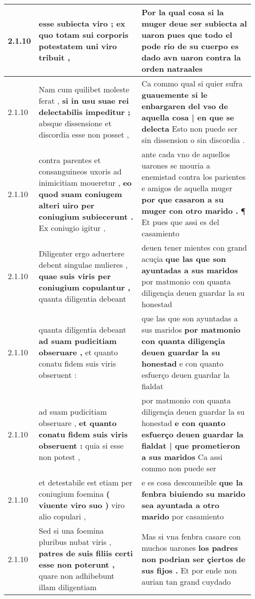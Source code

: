 \begin{tabular}{|p{1cm}|p{6.5cm}|p{6.5cm}|}
2.1.10 & esse subiecta viro ; \textbf{ ex quo totam sui corporis potestatem } uni viro tribuit , & Por la qual cosa si la muger deue ser subiecta al uaron \textbf{ pues que todo el pode rio de su cuerpo es dado avn uaron } contra la orden natraales \\\hline
2.1.10 & Nam cum quilibet moleste ferat , \textbf{ si in usu suae rei delectabilis impeditur ; } absque dissensione et discordia esse non posset , & Ca commo qual si quier sufra \textbf{ guauemente si le enbargaren del vso de aquella cosa | en que se delecta } Esto non puede ser sin dissension o sin discordia . \\\hline
2.1.10 & contra parentes et consanguineos uxoris ad inimicitiam moueretur , \textbf{ eo quod suam coniugem alteri uiro per coniugium subiecerunt . } Ex coniugio igitur , & ante cada vno de aquellos uarones se mouria a enemistad contra los parientes e amigos de aquella muger \textbf{ por que casaron a su muger con otro marido . } ¶ Et pues que assi es del casamiento \\\hline
2.1.10 & Diligenter ergo aduertere debent singulae mulieres , \textbf{ quae suis viris per coniugium copulantur , } quanta diligentia debeant & deuen tener mientes con grand acuçia \textbf{ que las que son ayuntadas a sus maridos } por matmonio con quanta diligençia deuen guardar la su honestad \\\hline
2.1.10 & quanta diligentia debeant \textbf{ ad suam pudicitiam obseruare , } et quanto conatu fidem suis viris obseruent : & que las que son ayuntadas a sus maridos \textbf{ por matmonio con quanta diligençia deuen guardar la su honestad } e con quanto esfuerço deuen guardar la fialdat \\\hline
2.1.10 & ad suam pudicitiam obseruare , \textbf{ et quanto conatu fidem suis viris obseruent : } quia si esse non potest , & por matmonio con quanta diligençia deuen guardar la su honestad \textbf{ e con quanto esfuerço deuen guardar la fialdat | que prometieron a sus maridos } Ca assi commo non puede ser \\\hline
2.1.10 & et detestabile est etiam per coniugium foemina \textbf{ ( viuente viro suo ) } viro alio copulari , & e es cosa desconueible \textbf{ que la fenbra biuiendo su marido sea ayuntada a otro marido } por casamiento \\\hline
2.1.10 & Sed si una foemina pluribus nubat viris , \textbf{ patres de suis filiis certi esse non poterunt , } quare non adhibebunt illam diligentiam & Mas si vna fenbra casare con muchos uarones \textbf{ los padres non podrian ser çiertos de sus fijos . } Et por ende non aurian tan grand cuydado \\\hline

\end{tabular}

